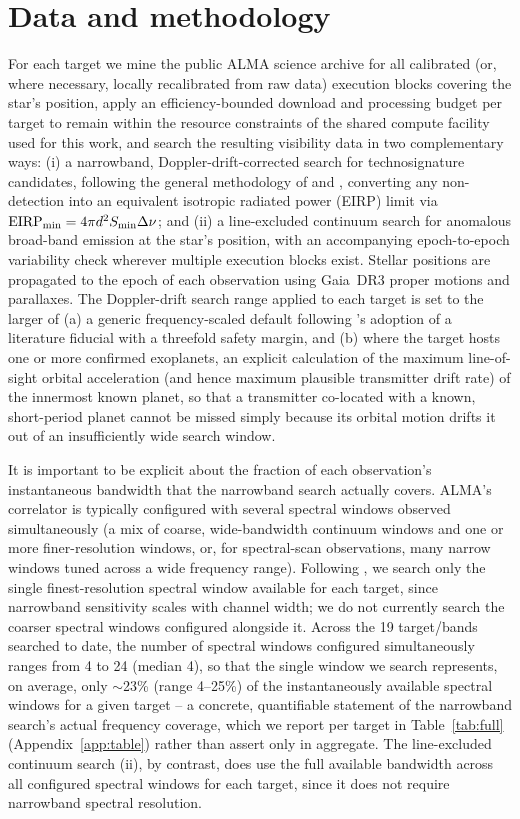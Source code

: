 \documentclass{openjournal}
\begin{document}
\section{Data and methodology}
\label{sec:method}

For each target we mine the public ALMA science archive for all calibrated (or,
where necessary, locally recalibrated from raw data) execution blocks covering
the star's position, apply an efficiency-bounded download and processing budget
per target to remain within the resource constraints of the shared compute
facility used for this work, and search the resulting visibility data in two
complementary ways: (i) a narrowband, Doppler-drift-corrected search for
technosignature candidates, following the general methodology of
\citet{Mason2024} and \citet{Enriquez2017}, converting any non-detection into an
equivalent isotropic radiated power (EIRP) limit via
$\mathrm{EIRP_{min}} = 4\pi d^{2} S_{\rm min} \Delta\nu$; and (ii) a
line-excluded continuum search for anomalous broad-band emission at the star's
position, with an accompanying epoch-to-epoch variability check wherever
multiple execution blocks exist. Stellar positions are propagated to the epoch
of each observation using Gaia~DR3 proper motions and parallaxes. The
Doppler-drift search range applied to each target is set to the larger of (a) a
generic frequency-scaled default following \citet{Mason2024}'s adoption of a
literature fiducial with a threefold safety margin, and (b) where the target
hosts one or more confirmed exoplanets, an explicit calculation of the maximum
line-of-sight orbital acceleration (and hence maximum plausible transmitter
drift rate) of the innermost known planet, so that a transmitter co-located with
a known, short-period planet cannot be missed simply because its orbital motion
drifts it out of an insufficiently wide search window.

It is important to be explicit about the fraction of each observation's
instantaneous bandwidth that the narrowband search actually covers.
ALMA's correlator is typically configured with several spectral windows
observed simultaneously (a mix of coarse, wide-bandwidth continuum
windows and one or more finer-resolution windows, or, for spectral-scan
observations, many narrow windows tuned across a wide frequency range).
Following \citet{Mason2024}, we search only the single finest-resolution
spectral window available for each target, since narrowband sensitivity
scales with channel width; we do not currently search the coarser
spectral windows configured alongside it. Across the 19 target/bands
searched to date, the number of spectral windows configured
simultaneously ranges from 4 to 24 (median 4), so that the single window
we search represents, on average, only $\sim$23\% (range 4--25\%) of the
instantaneously available spectral windows for a given target -- a
concrete, quantifiable statement of the narrowband search's actual
frequency coverage, which we report per target in
Table~\ref{tab:full} (Appendix~\ref{app:table}) rather than assert only
in aggregate. The line-excluded continuum search (ii), by contrast, does
use the full available bandwidth across all configured spectral windows
for each target, since it does not require narrowband spectral
resolution.
\end{document}
